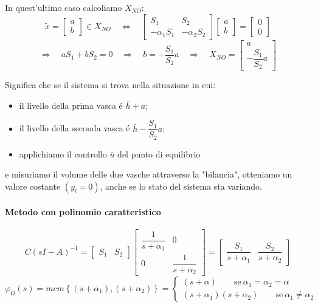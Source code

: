 \documentclass[../main.tex]{subfiles}
\begin{document}
\begin{Exercise}[title={Studiare l'osservabilit\'a di due vasche in parallelo}]
				In quest'ultimo caso calcoliamo $ X_{NO} $:
				\[
					\tilde x =
					\begin{bmatrix}
						a\\
						b
					\end{bmatrix} \in X_{NO}
					\quad\Leftrightarrow\quad 
					\begin{bmatrix}
						S_1 & S_2\\
						-\alpha_1 S_1 & -\alpha_2 S_2
					\end{bmatrix}
					\begin{bmatrix}
						a\\
						b
					\end{bmatrix} =
					\begin{bmatrix}
						0\\
						0
					\end{bmatrix}
				\]
				\[
					\Rightarrow\quad aS_1 + bS_2 = 0 \quad\Rightarrow\quad b = -\dfrac{S_1}{S_2}a \quad\Rightarrow\quad X_{NO} =
					\begin{bmatrix}
						a\\
						-\dfrac{S_1}{S_2}a
					\end{bmatrix}
				\]
				
				Significa che se il sistema si trova nella situazione in cui:
				\begin{itemize}
					\item 
						il livello della prima vasca \'e $ \bar h + a $;
					\item 
						il livello della seconda vasca \'e $ \bar h - \dfrac{S_1}{S_2}a $;
					\item 
						applichiamo il controllo $ \bar u $ del punto di equilibrio
				\end{itemize}
				e misuriamo il volume delle due vasche attraverso la "bilancia", otteniamo un valore costante $ (y_l = 0) $, anche se lo stato del sistema sta variando.
				
			\paragraph{Metodo con polinomio caratteristico}
				\[
					C(sI-A)^{-1} =
					\begin{bmatrix}
						S_1 & S_2
					\end{bmatrix}
					\begin{bmatrix}
						\dfrac{1}{s+\alpha_1} & 0\\
						0 & \dfrac{1}{s+\alpha_2}
					\end{bmatrix} =
					\begin{bmatrix}
						\dfrac{S_1}{s+\alpha_1} & \dfrac{S_2}{s+\alpha_2}
					\end{bmatrix}
				\]
				\[
					\varphi_O(s) = mcm\left\lbrace (s+\alpha_1), (s+\alpha_2) \right\rbrace =
					\begin{cases}
						(s+\alpha) \qquad\text{se}\ \alpha_1 = \alpha_2 = \alpha\\
						(s+\alpha_1)(s+\alpha_2) \qquad\text{se}\ \alpha_1 \neq \alpha_2
					\end{cases}
				\]
				

\end{Exercise}
\end{document}
